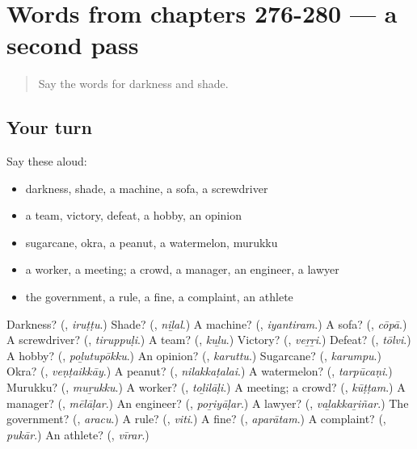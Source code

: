 \section[(dialogue)]{Words from chapters 276-280 — a second pass}

\label{lesson:TA-R280-second-pass-words-from-chapters-276-280}



\begin{quote}
Say the words for darkness and shade.
\end{quote}

\subsection*{Your turn}
Say these aloud:

\begin{itemize}
\raggedright
  \item darkness, shade, a machine, a sofa, a screwdriver
  \item a team, victory, defeat, a hobby, an opinion
  \item sugarcane, okra, a peanut, a watermelon, murukku
  \item a worker, a meeting; a crowd, a manager, an engineer, a lawyer
  \item the government, a rule, a fine, a complaint, an athlete
\end{itemize}

\begin{tcolorbox}[breakable,colback=teal!4,colframe=teal!35!black,title={Before you move on}]
Darkness? (\textbf{}, \emph{iruṭṭu}.) Shade? (\textbf{}, \emph{niḻal}.) A machine? (\textbf{}, \emph{iyantiram}.) A sofa? (\textbf{}, \emph{cōpā}.) A screwdriver? (\textbf{}, \emph{tiruppuḷi}.) A team? (\textbf{}, \emph{kuḻu}.) Victory? (\textbf{}, \emph{veṟṟi}.) Defeat? (\textbf{}, \emph{tōlvi}.) A hobby? (\textbf{}, \emph{poḻutupōkku}.) An opinion? (\textbf{}, \emph{karuttu}.) Sugarcane? (\textbf{}, \emph{karumpu}.) Okra? (\textbf{}, \emph{veṇṭaikkāy}.) A peanut? (\textbf{}, \emph{nilakkaṭalai}.) A watermelon? (\textbf{}, \emph{tarpūcaṇi}.) Murukku? (\textbf{}, \emph{muṟukku}.) A worker? (\textbf{}, \emph{toḻilāḷi}.) A meeting; a crowd? (\textbf{}, \emph{kūṭṭam}.) A manager? (\textbf{}, \emph{mēlāḷar}.) An engineer? (\textbf{}, \emph{poṟiyāḷar}.) A lawyer? (\textbf{}, \emph{vaḻakkaṟiñar}.) The government? (\textbf{}, \emph{aracu}.) A rule? (\textbf{}, \emph{viti}.) A fine? (\textbf{}, \emph{aparātam}.) A complaint? (\textbf{}, \emph{pukār}.) An athlete? (\textbf{}, \emph{vīrar}.)
\end{tcolorbox}
